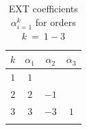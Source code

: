 \begin{table}[ht] 
\centering %
\begin{tabular}{c c c c} %
\hline\hline    %
$k$  & $\alpha_1$ & $\alpha_2$ & $\alpha_3$   \\ [0.5 ex] %
\hline  %
$1$ & $1$   \\
$2$ & ${2}$ & $-1$  \\
$3$ & $3$ & $-3$ & $1$ \\
\hline \\ [1 ex]
\end{tabular} 
\caption[EXT Coefficients]{EXT coefficients $\alpha_{i=1}^{k}$ for orders $k\ = \ 1-3$} %
\label{table:EXT} %
\end{table} 